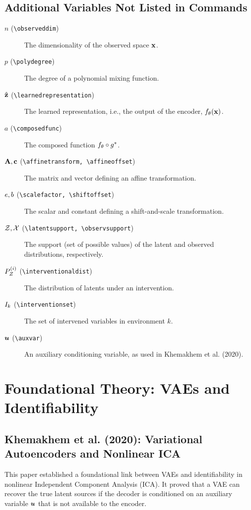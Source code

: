 \documentclass{article}
\begin{document}
\subsection{Additional Variables Not Listed in Commands}
\begin{description}
    \item[$n$ (\texttt{\textbackslash observeddim})] The dimensionality of the observed space ${\mathbf{x}}$.
    \item[$p$ (\texttt{\textbackslash polydegree})] The degree of a polynomial mixing function.
    \item[$\hat{{\mathbf{z}}}$ (\texttt{\textbackslash learnedrepresentation})] The learned representation, i.e., the output of the encoder, $f_\theta({\mathbf{x}})$.
    \item[$a$ (\texttt{\textbackslash composedfunc})] The composed function $f_\theta \circ g^*$.
    \item[$\affinetransform, \affineoffset$ (\texttt{\textbackslash affinetransform, \textbackslash affineoffset})] The matrix and vector defining an affine transformation.
    \item[$e, b$ (\texttt{\textbackslash scalefactor, \textbackslash shiftoffset})] The scalar and constant defining a shift-and-scale transformation.
    \item[$\mathcal{Z}, \mathcal{X}$ (\texttt{\textbackslash latentsupport, \textbackslash observsupport})] The support (set of possible values) of the latent and observed distributions, respectively.
    \item[$P_Z^{(i)}$ (\texttt{\textbackslash interventionaldist})] The distribution of latents under an intervention.
    \item[$I_k$ (\texttt{\textbackslash interventionset})] The set of intervened variables in environment $k$.
    \item[${\bm{u}}$ (\texttt{\textbackslash auxvar})] An auxiliary conditioning variable, as used in Khemakhem et al. (2020).
\end{description}

\section{Foundational Theory: VAEs and Identifiability}

\subsection{Khemakhem et al. (2020): Variational Autoencoders and Nonlinear ICA}
This paper established a foundational link between VAEs and identifiability in nonlinear Independent Component Analysis (ICA). It proved that a VAE can recover the true latent sources if the decoder is conditioned on an auxiliary variable ${\bm{u}}$ that is not available to the encoder.
\end{document}
